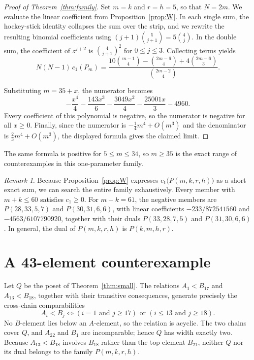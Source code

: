 \documentclass[11pt]{amsart}
\theoremstyle{remark}
\newtheorem{remark}[theorem]{Remark}
\numberwithin{equation}{section}
\newcommand{\lin}{c_1}
\begin{document}
\begin{proof}[Proof of Theorem~\ref{thm:family}]
Set $m=k$ and $r=h=5$, so that $N=2m$. We evaluate the linear coefficient from
Proposition~\ref{prop:W}. In each single sum, the hockey-stick identity
collapses the sum over the strip, and we rewrite the resulting binomial
coefficients using $(j+1)\binom5{j+1}=5\binom4j$. In the double sum, the
coefficient of $z^{j+2}$ is $\binom4{j+1}^2$ for $0\le j\le3$. Collecting terms
yields
\[
 N(N-1)\,\lin(P_m)=\frac{10\binom{m-1}{4}-\binom{2m-6}{4}+4\binom{2m-6}{3}}
 {\binom{2m-2}{4}}.
\]

Substituting $m=35+x$, the numerator becomes
\[
 -\frac{x^4}{4}-\frac{143x^3}{6}-\frac{3049x^2}{4}-\frac{25001x}{3}-4960.
\]
Every coefficient of this polynomial is negative, so the numerator is negative
for all $x\ge0$. Finally, since the numerator is $-\tfrac{1}{4}m^4+O(m^3)$ and
the denominator is $\tfrac{2}{3}m^4+O(m^3)$, the displayed formula gives the
claimed limit.
\end{proof}

The same formula is positive for $5\le m\le34$, so $m\ge35$ is the exact range
of counterexamples in this one-parameter family.

\begin{remark}\label{rem:smallest}
Because Proposition~\ref{prop:W} expresses $\lin\bigl(P(m,k,r,h)\bigr)$ as a
short exact sum, we can search the entire family exhaustively. Every member
with $m+k\le60$ satisfies $\lin\ge0$. For $m+k=61$, the negative members are
$P(28,33,5,7)$ and $P(30,31,6,6)$, with linear coefficients $-233/872541560$ and
$-4563/6107790920$, together with their duals $P(33,28,7,5)$ and
$P(31,30,6,6)$. In general, the dual of $P(m,k,r,h)$ is $P(k,m,h,r)$.
\end{remark}

\section{A 43-element counterexample}\label{sec:small}

Let $Q$ be the poset of Theorem~\ref{thm:small}. The relations $A_1<B_{17}$ and
$A_{13}<B_{18}$, together with their transitive consequences, generate
precisely the cross-chain comparabilities
\[
 A_i<B_j\iff (i=1\text{ and }j\ge17)\text{ or }(i\le13\text{ and }j\ge18).
\]
No $B$-element lies below an $A$-element, so the relation is acyclic. The two
chains cover $Q$, and $A_{22}$ and $B_1$ are incomparable; hence $Q$ has width
exactly two. Because $A_{13}<B_{18}$ involves $B_{18}$ rather than the top
element $B_{21}$, neither $Q$ nor its dual belongs to the family $P(m,k,r,h)$.
\end{document}
